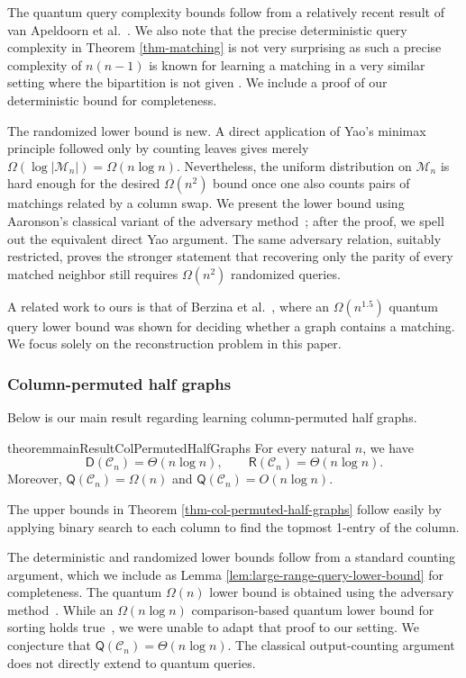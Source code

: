 \documentclass[11pt]{article}
\newcommand{\cC}{\mathcal{C}}
\newcommand{\cM}{\mathcal{M}}
\newcommand{\sD}{\mathsf{D}}
\newcommand{\sQ}{\mathsf{Q}}
\newcommand{\sR}{\mathsf{R}}
\begin{document}
The quantum query complexity bounds follow from a relatively recent result of van Apeldoorn et al.~\cite{AGLNWW21}.
We also note that the precise deterministic query complexity in Theorem \ref{thm-matching} is not very surprising as such a precise complexity of $n(n-1)$ is known for learning a matching in a very similar setting where the bipartition is not given \cite{Aig88}. 
We include a proof of our deterministic bound for completeness.

The randomized lower bound is new. A direct application of Yao's minimax principle followed only by counting leaves gives merely $\Omega(\log |\cM_n|)=\Omega(n\log n)$. Nevertheless, the uniform distribution on $\cM_n$ is hard enough for the desired $\Omega(n^2)$ bound once one also counts pairs of matchings related by a column swap. We present the lower bound using Aaronson's classical variant of the adversary method~\cite{Aar04}; after the proof, we spell out the equivalent direct Yao argument. The same adversary relation, suitably restricted, proves the stronger statement that recovering only the parity of every matched neighbor still requires $\Omega(n^2)$ randomized queries.

A related work to ours is that of Berzina et al.~\cite{BDFLS04}, where an $\Omega(n^{1.5})$ quantum query lower bound was shown for deciding whether a graph contains a matching. We focus solely on the reconstruction problem in this paper.


\subsubsection{Column-permuted half graphs}

Below is our main result regarding learning column-permuted half graphs.
\begin{restatable}{theorem}{mainResultColPermutedHalfGraphs}
\label{thm-col-permuted-half-graphs}
    For every natural $n$, we have
    $$
    \sD(\cC_n) = \Theta(n \log n), \qquad \sR(\cC_n) = \Theta(n \log n).
    $$
    Moreover, $\sQ(\cC_n)=\Omega(n)$ and $\sQ(\cC_n)=O(n\log n)$.
\end{restatable}

The upper bounds in Theorem \ref{thm-col-permuted-half-graphs} follow easily by applying binary search to each column to find the topmost 1-entry of the column.

The deterministic and randomized lower bounds follow from a standard counting argument, which we include as Lemma \ref{lem:large-range-query-lower-bound} for completeness.
The quantum $\Omega(n)$ lower bound is obtained using the adversary method~\cite{Amb02}. While an $\Omega(n \log n)$ comparison-based quantum lower bound for sorting holds true~\cite{HNS02}, we were unable to adapt that proof to our setting.
We conjecture that $\sQ(\cC_n)=\Theta(n\log n)$. The classical output-counting argument does not directly extend to quantum queries.
\end{document}
